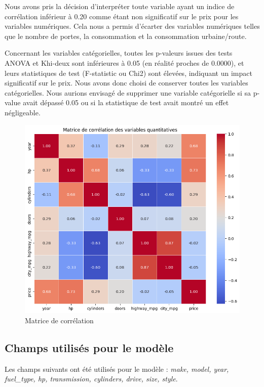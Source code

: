\documentclass[12pt]{report}
\begin{document}
\begin{itemize}
    Nous avons pris la décision d'interpréter toute variable ayant un indice de corrélation inférieur à 0.20 comme étant non significatif sur le prix pour les variables numériques. Cela nous a permis d'écarter des variables numériques telles que le nombre de portes, la consommation et la consommation urbaine/route. 
    
    Concernant les variables catégorielles, toutes les p-valeurs issues des tests ANOVA et Khi-deux sont inférieures à 0.05 (en réalité proches de 0.0000), et leurs statistiques de test (F-statistic ou Chi2) sont élevées, indiquant un impact significatif sur le prix. Nous avons donc choisi de conserver toutes les variables catégorielles. Nous aurions envisagé de supprimer une variable catégorielle si sa p-value avait dépassé 0.05 ou si la statistique de test avait montré un effet négligeable.
\end{itemize}


\begin{figure}[H]
    \centering
    \includegraphics[width=1\textwidth]{correlation_matrix.png}
    \caption{Matrice de corrélation}
    \label{fig:correlation-matrix}
\end{figure}
\subsection{Champs utilisés pour le modèle}
Les champs suivants ont été utilisés pour le modèle : \textit{make, model, year, fuel\_type, hp, transmission, cylinders, drive, size, style}.
\end{document}
